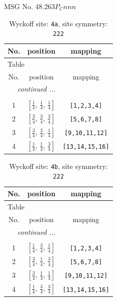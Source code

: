 \documentclass[fleqn,8pt]{jsarticle}
\begin{document}
\setcounter{MaxMatrixCols}{32}

\renewcommand{\tablename}{Table~}
\renewcommand{\figurename}{Figure~}
\begin{center}
\LARGE
MSG No. 48.263\quad$P_{C}nnn$
\end{center}
\renewcommand{\arraystretch}{1.2}
\begin{longtable}{ccc}
\caption{Wyckoff site: {\tt 4a}, site symmetry: {\tt 222}}
 \\
 \hline \hline
No. & position & mapping \\ \hline \endfirsthead

\multicolumn{2}{l}{\tablename\ \thetable{}} \\
 \hline \hline
No. & position & mapping \\ \hline \endhead

 \hline \hline
\multicolumn{2}{r}{\footnotesize\it continued ...} \\ \endfoot

 \hline \hline
\multicolumn{2}{r}{} \\ \endlastfoot

1 & $\left[ \frac{1}{4},\, \frac{1}{4},\, \frac{1}{4} \right]$ & {\tt [1,2,3,4]} \\ \hline
2 & $\left[ \frac{3}{4},\, \frac{3}{4},\, \frac{3}{4} \right]$ & {\tt [5,6,7,8]} \\ \hline
3 & $\left[ \frac{3}{4},\, \frac{3}{4},\, \frac{1}{4} \right]$ & {\tt [9,10,11,12]} \\ \hline
4 & $\left[ \frac{1}{4},\, \frac{1}{4},\, \frac{3}{4} \right]$ & {\tt [13,14,15,16]} \\
\end{longtable}
\renewcommand{\arraystretch}{1.2}
\begin{longtable}{ccc}
\caption{Wyckoff site: {\tt 4b}, site symmetry: {\tt 222}}
 \\
 \hline \hline
No. & position & mapping \\ \hline \endfirsthead

\multicolumn{2}{l}{\tablename\ \thetable{}} \\
 \hline \hline
No. & position & mapping \\ \hline \endhead

 \hline \hline
\multicolumn{2}{r}{\footnotesize\it continued ...} \\ \endfoot

 \hline \hline
\multicolumn{2}{r}{} \\ \endlastfoot

1 & $\left[ \frac{1}{4},\, \frac{3}{4},\, \frac{1}{4} \right]$ & {\tt [1,2,3,4]} \\ \hline
2 & $\left[ \frac{3}{4},\, \frac{1}{4},\, \frac{3}{4} \right]$ & {\tt [5,6,7,8]} \\ \hline
3 & $\left[ \frac{3}{4},\, \frac{1}{4},\, \frac{1}{4} \right]$ & {\tt [9,10,11,12]} \\ \hline
4 & $\left[ \frac{1}{4},\, \frac{3}{4},\, \frac{3}{4} \right]$ & {\tt [13,14,15,16]} \\
\end{longtable}
\end{document}

